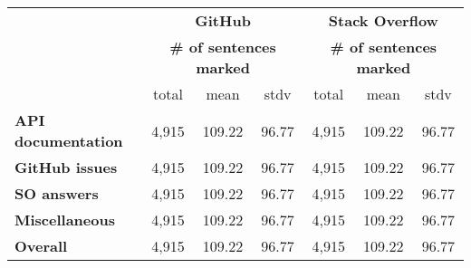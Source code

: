 \begin{table}[H]
\centering    
\caption{}
\label{tbl:corpus-annotation-summary-by-task}
\begin{scriptsize}
\begin{threeparttable}
\begin{tabular}{lcccccc}



& \multicolumn{3}{c}{\textbf{GitHub}} & \multicolumn{3}{c}{\textbf{Stack Overflow}} \\

& \multicolumn{3}{c}{\textbf{\# of sentences marked}} 
& \multicolumn{3}{c}{\textbf{\# of sentences marked}}
\\ \cmidrule(l){2-4}  \cmidrule(l){5-7} 

& total & mean & stdv 
%
& total & mean & stdv
\\

\hline

\textbf{API documentation} 
& 4,915 & 109.22 & 96.77 %
& 4,915 & 109.22 & 96.77 %
\\
\textbf{GitHub issues} 
& 4,915 & 109.22 & 96.77 %
& 4,915 & 109.22 & 96.77 %
\\
\textbf{SO answers} 
& 4,915 & 109.22 & 96.77 %
& 4,915 & 109.22 & 96.77 %
\\
\textbf{Miscellaneous} 
& 4,915 & 109.22 & 96.77 %
& 4,915 & 109.22 & 96.77 %
\\

\hline
\textbf{Overall} 
& 4,915 & 109.22 & 96.77 %
& 4,915 & 109.22 & 96.77 %
\\
\hline

\end{tabular}
\end{threeparttable}
\end{scriptsize}
\end{table}

